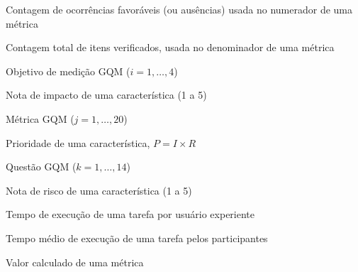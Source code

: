\begin{simbolos}
  \item[$ A $] Contagem de ocorrências favoráveis (ou ausências) usada no numerador de uma métrica
  \item[$ B $] Contagem total de itens verificados, usada no denominador de uma métrica
  \item[$ G_i $] Objetivo de medição GQM ($i = 1, \ldots, 4$)
  \item[$ I $] Nota de impacto de uma característica (1 a 5)
  \item[$ M_j $] Métrica GQM ($j = 1, \ldots, 20$)
  \item[$ P $] Prioridade de uma característica, $P = I \times R$
  \item[$ Q_k $] Questão GQM ($k = 1, \ldots, 14$)
  \item[$ R $] Nota de risco de uma característica (1 a 5)
  \item[$ T_e $] Tempo de execução de uma tarefa por usuário experiente
  \item[$ T_p $] Tempo médio de execução de uma tarefa pelos participantes
  \item[$ X $] Valor calculado de uma métrica
\end{simbolos}
